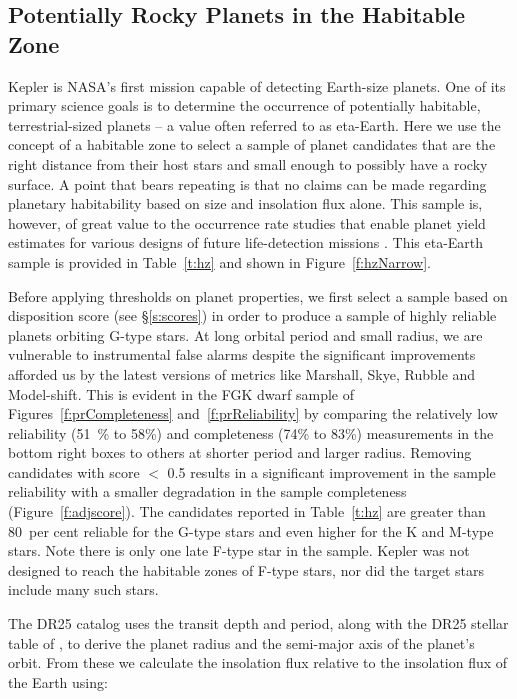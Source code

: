 \label{s:hz}
\subsection{Potentially Rocky Planets in the Habitable Zone}

Kepler is NASA's first mission capable of detecting Earth-size planets.  One of its primary science goals is to determine the occurrence of potentially habitable, terrestrial-sized planets -- a value often referred to as eta-Earth.  Here we use the concept of a habitable zone to select a sample of planet candidates that are the right distance from their host stars and small enough to possibly have a rocky surface. A point that bears repeating is that no claims can be made regarding planetary habitability based on size and insolation flux alone.   This sample is, however, of great value to the occurrence rate studies that enable planet yield estimates for various designs of future life-detection missions \citep{stark2015}. This eta-Earth sample is provided in Table~\ref{t:hz} and shown in Figure~\ref{f:hzNarrow}.


Before applying thresholds on planet properties, we first select a sample based on disposition score (see \S\ref{s:scores}) in order to produce a sample of highly reliable planets orbiting G-type stars. At long orbital period and small radius, we are vulnerable to instrumental false alarms despite the significant improvements afforded us by the latest versions of metrics like Marshall, Skye, Rubble and Model-shift. This is evident in the FGK dwarf sample of Figures~\ref{f:prCompleteness} and~\ref{f:prReliability} by comparing the relatively low reliability (51~\% to 58\%) and completeness (74\% to 83\%) measurements in the bottom right boxes to others at shorter period and larger radius.  Removing candidates with score $<$ 0.5 results in a significant improvement in the sample reliability with a smaller degradation in the sample completeness (Figure~\ref{f:adjscore}).  The candidates reported in Table~\ref{t:hz} are greater than 80~per cent reliable for the G-type stars and even higher for the K and M-type stars. Note there is only one late F-type star in the sample.  Kepler was not designed to reach the habitable zones of F-type stars, nor did the target stars include many such stars.


The DR25 catalog uses the transit depth and period, along with the DR25 stellar table of \citet{Mathur2017ApJS}, to derive the planet radius and the semi-major axis of the planet's orbit.  From these we calculate the insolation flux relative to the insolation flux of the Earth using:

